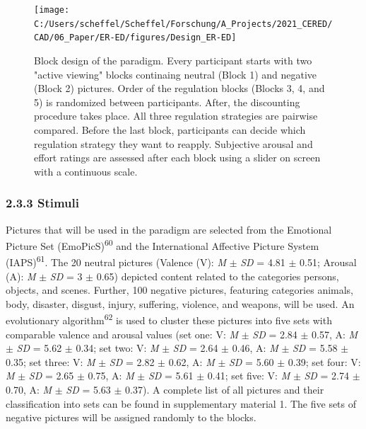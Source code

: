 \documentclass[
  english,
  man,floatsintext]{apa6}
\begin{document}
\begin{figure}
\texttt{[image: C:/Users/scheffel/Scheffel/Forschung/A\_Projects/2021\_CERED/CAD/06\_Paper/ER-ED/figures/Design\_ER-ED]} \caption{Block design of the paradigm. Every participant starts with two "active viewing" blocks continaing neutral (Block 1) and negative (Block 2) pictures. Order of the regulation blocks (Blocks 3, 4, and 5) is randomized between participants. After, the discounting procedure takes place. All three regulation strategies are pairwise compared. Before the last block, participants can decide which regulation strategy they want to reapply. Subjective arousal and effort ratings are assessed after each block using a slider on screen with a continuous scale.}\label{fig:DesignERED}
\end{figure}

\hypertarget{stimuli}{%
\subsubsection{2.3.3 Stimuli}\label{stimuli}}

Pictures that will be used in the paradigm are selected from the Emotional Picture Set (EmoPicS)\textsuperscript{60} and the International Affective Picture System (IAPS)\textsuperscript{61}.
The 20 neutral pictures (Valence (V): \emph{M} \(\pm\) \emph{SD} = 4.81 \(\pm\) 0.51; Arousal (A): \emph{M} \(\pm\) \emph{SD} = 3 \(\pm\) 0.65) depicted content related to the categories persons, objects, and scenes.
Further, 100 negative pictures, featuring categories animals, body, disaster, disgust, injury, suffering, violence, and weapons, will be used.
An evolutionary algorithm\textsuperscript{62} is used to cluster these pictures into five sets with comparable valence and arousal values (set one: V: \emph{M} \(\pm\) \emph{SD} = 2.84 \(\pm\) 0.57, A: \emph{M} \(\pm\) \emph{SD} = 5.62 \(\pm\) 0.34; set two: V: \emph{M} \(\pm\) \emph{SD} = 2.64 \(\pm\) 0.46, A: \emph{M} \(\pm\) \emph{SD} = 5.58 \(\pm\) 0.35; set three: V: \emph{M} \(\pm\) \emph{SD} = 2.82 \(\pm\) 0.62, A: \emph{M} \(\pm\) \emph{SD} = 5.60 \(\pm\) 0.39; set four: V: \emph{M} \(\pm\) \emph{SD} = 2.65 \(\pm\) 0.75, A: \emph{M} \(\pm\) \emph{SD} = 5.61 \(\pm\) 0.41; set five: V: \emph{M} \(\pm\) \emph{SD} = 2.74 \(\pm\) 0.70, A: \emph{M} \(\pm\) \emph{SD} = 5.63 \(\pm\) 0.37).
A complete list of all pictures and their classification into sets can be found in supplementary material 1.
The five sets of negative pictures will be assigned randomly to the blocks.
\end{document}
